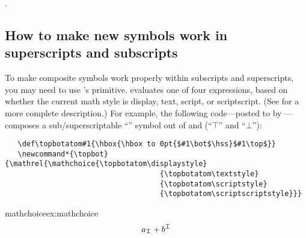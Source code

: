 \ifhavecenternot
\else
  .
\fi   
{}


\subsection{How to make new symbols work in superscripts and subscripts}



To make composite symbols work properly within subscripts and
superscripts, you may need to use \tex's \cmd{\mathchoice} primitive.
\cmd{\mathchoice} evaluates one of four expressions, based on whether
the current math style is display, text, script, or scriptscript.
(See \TeXbook for a more complete description.)  For example, the
following \latex code---posted to \ctt by
---composes a sub/superscriptable
``\cmd{\topbot}'' symbol out of \cmdX{\top} and \cmdX{\bot} (``$\top$''
and ``$\bot$''):



\indexcommand{\displaystyle}%
\indexcommand{\textstyle}%
\indexcommand{\scriptstyle}%
\indexcommand{\scriptscriptstyle}%
\label{code:topbot}%

\begin{verbatim}
   \def\topbotatom#1{\hbox{\hbox to 0pt{$#1\bot$\hss}$#1\top$}}
   \newcommand*{\topbot}{\mathrel{\mathchoice{\topbotatom\displaystyle}
                                    {\topbotatom\textstyle}
                                    {\topbotatom\scriptstyle}
                                    {\topbotatom\scriptscriptstyle}}}
\end{verbatim}

\begin{texexample}{mathchoice}{ex:mathchoice}
\bgroup
\def\topbotatom#1{\hbox{\hbox to 0pt{$#1\bot$\hss}$#1\top$}}
   \def\topbot{\mathrel{\mathchoice{\topbotatom\displaystyle}
                                    {\topbotatom\textstyle}
                                    {\topbotatom\scriptstyle}
                                    {\topbotatom\scriptscriptstyle}}}
\[ a_{\topbot} + b^{\topbot} \]
\egroup
\end{texexample}


